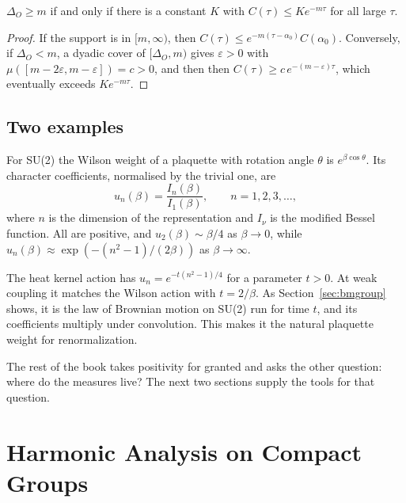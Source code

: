 \begin{proposition}\label{prop:gapdecay}
$\Delta_O\ge m$ if and only if there is a constant $K$ with $C(\tau)\le Ke^{-m\tau}$ for all large $\tau$.
\end{proposition}

\begin{proof}
If the support is in $[m,\infty)$, then $C(\tau)\le e^{-m(\tau-\alpha_0)}C(\alpha_0)$. Conversely, if $\Delta_O<m$, a dyadic cover of $[\Delta_O,m)$ gives $\varepsilon>0$ with $\mu([m-2\varepsilon,m-\varepsilon])=c>0$, and then then $C(\tau)\ge c\,e^{-(m-\varepsilon)\tau}$, which eventually exceeds $Ke^{-m\tau}$.
\end{proof}

\subsection{Two examples}\label{sec:examples}

\begin{example}
For SU(2) the Wilson weight of a plaquette with rotation angle $\theta$ is $e^{\beta\cos\theta}$. Its character coefficients, normalised by the trivial one, are
\[
u_n(\beta)=\frac{I_n(\beta)}{I_1(\beta)},\qquad n=1,2,3,\dots,
\]
where $n$ is the dimension of the representation and $I_\nu$ is the modified Bessel function. All are positive, and $u_2(\beta)\sim\beta/4$ as $\beta\to0$, while $u_n(\beta)\approx\exp(-(n^2-1)/(2\beta))$ as $\beta\to\infty$.
\end{example}

\begin{example}
The heat kernel action has $u_n=e^{-t(n^2-1)/4}$ for a parameter $t>0$. At weak coupling it matches the Wilson action with $t=2/\beta$. As Section~\ref{sec:bmgroup} shows, it is the law of Brownian motion on SU(2) run for time $t$, and its coefficients multiply under convolution. This makes it the natural plaquette weight for renormalization.
\end{example}

The rest of the book takes positivity for granted and asks the other question: where do the measures live? The next two sections supply the tools for that question.

\section{Harmonic Analysis on Compact Groups}\label{ch:harmonic}

